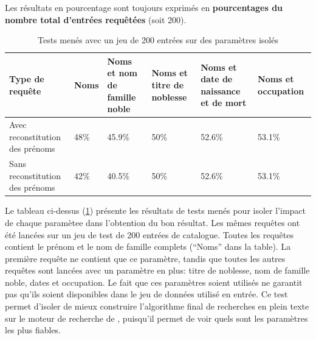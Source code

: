Les résultats en pourcentage sont toujours exprimés en \textbf{pourcentages du nombre total d'entrées requêtées} (soit 200).
\pagebreak

\begin{table}[h]
	\centering
	\begin{tabular}{>{\centering}m{3cm}m{2cm}m{2cm}m{2cm}m{2cm}m{2cm}}
		\hline
		\textbf{Type de requête} & \textbf{Noms} & \textbf{Noms et nom de famille noble} & \textbf{Noms et titre de noblesse} & \textbf{Noms et date de naissance et de mort} & \textbf{Noms et occupation} \\
		\hline
		\hline
		Avec reconstitution des prénoms & 48\% & 45.9\% & 50\% & 52.6\% & 53.1\% \\
		\hline
		Sans reconstitution des prénoms & 42\% & 40.5\% & 50\% & 52.6\% & 53.1\% \\
		\hline	
	\end{tabular}
	\caption{Tests menés avec un jeu de 200 entrées sur des paramètres isolés}
	\label{appendix:testisolate}
\end{table}

Le tableau ci-dessus (\ref{appendix:testisolate}) présente les résultats de tests menés pour isoler l'impact de chaque paramètee dans l'obtention du bon résultat. Les mêmes requêtes ont été lancées sur un jeu de test de 200 entrées de catalogue. Toutes les requêtes contient le prénom et le nom de famille complets (\enquote{Noms} dans la table). La première requête ne contient que ce paramètre, tandis que toutes les autres requêtes sont lancées avec un paramètre en plus: titre de noblesse, nom de famille noble, dates et occupation. Le fait que ces paramètres soient utilisés ne garantit pas qu'ils soient disponibles dans le jeu de données utilisé en entrée.  Ce test permet d'isoler de mieux construire l'algorithme final de recherches en plein texte sur le moteur de recherche de \wkd{}, puisqu'il permet de voir quels sont les paramètres les plus fiables.
\vfill
\clearpage


